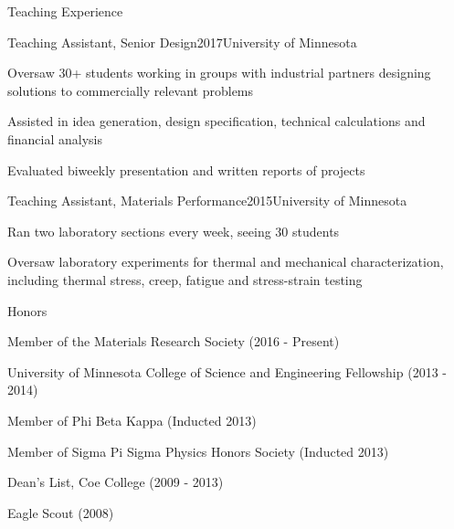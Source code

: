 \documentclass{resume} %
\begin{document}

\begin{rSection}{Teaching Experience}
\begin{rSubsection}{Teaching Assistant, Senior Design}{2017}{University of Minnesota}{}
\item Oversaw 30+ students working in groups with industrial partners designing solutions to commercially relevant problems
\item Assisted in idea generation, design specification, technical calculations and financial analysis
\item Evaluated biweekly presentation and written reports of projects
\end{rSubsection}
\pagebreak

\begin{rSubsection}{Teaching Assistant, Materials Performance}{2015}{University of Minnesota}{}
\item Ran two laboratory sections every week, seeing 30 students
\item Oversaw laboratory experiments for thermal and mechanical characterization, including thermal stress, creep, fatigue and stress-strain testing
\end{rSubsection}

\end{rSection}

\begin{rSection}{Honors}

\item Member of the Materials Research Society (2016 - Present)
\item University of Minnesota College of Science and Engineering Fellowship (2013 - 2014)
\item Member of Phi Beta Kappa (Inducted 2013)
\item Member of Sigma Pi Sigma Physics Honors Society (Inducted 2013)
\item Dean's List, Coe College (2009 - 2013)
\item Eagle Scout (2008)

\end{rSection}
\end{document}
